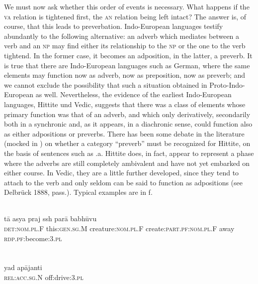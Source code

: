 We must now ask whether this order of events is necessary. What happens if the \textsc{va} relation is tightened first, the \textsc{an} relation being left intact? The answer is, of course, that this leads to preverbation. Indo-European languages testify abundantly to the following alternative: an adverb which mediates between a verb and an \textsc{np} may find either its relationship to the \textsc{np} or the one to the verb tightend. In the former case, it becomes an adposition, in the latter, a preverb. It is true that there are Indo-European languages such as German, where the same elements may function now as adverb, now as preposition, now as preverb; and we cannot exclude the possibility that such a situation obtained in Proto-Indo-European as well. Nevertheless, the evidence of the earliest Indo-European languages, Hittite und Vedic, suggests that there was a class of elements whose primary function was that of an adverb, and which only derivatively, secondarily both in a synchronic and, as it appears, in a diachronic sense, could function also as either adpositions or preverbs. There has been some debate in the literature (mocked in \citealt[127--131]{Starke1977}) on whether a category ``preverb'' must be recognized for Hittite, on the basis of sentences such as .a. Hittite does, in fact, appear to represent a phase where the adverbs are still completely ambivalent and have not yet embarked on either course.\label{page106} In Vedic, they are a little further developed, since they tend to attach to the verb and only seldom can be said to function as adpositions (see Delbrück 1888, pass.). Typical examples are in f.

\ea\label{ex:E78}
\\
\gll t\=a  asya  praj  ssh par\=a  babh\=uvu  \\
 \textsc{det}:\textsc{nom}.\textsc{pl}.F  this:\textsc{gen}.\textsc{sg}.M  creature:\textsc{nom}.\textsc{pl}.F  create:\textsc{part}.\textsc{pf}:\textsc{nom}.\textsc{pl}.F  away  \textsc{rdp}.\textsc{pf}:become:3.\textsc{pl}  \\
\\
\z
\noindent \ea\label{ex:E79}
 \\
\gll yad  ap\=ajanti  \\
\textsc{rel}:\textsc{acc}.\textsc{sg}.N  off:drive:3.\textsc{pl}  \\
\\
\z 

